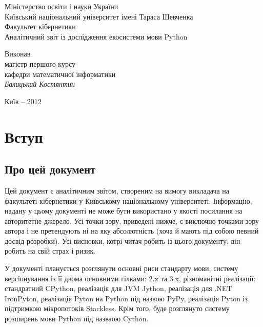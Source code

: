 \documentclass[a4paper, 12pt, onsedie]{article}
\begin{document}
\begin{titlepage}
    \begin{center}
        \normalsize{
            Міністерство освіти і науки України\\
            Київський національний університет імені Тараса Шевченка\\
            Факультет кібернетики\\[4.0cm]
        }
        \Huge{Аналітичний звіт із дослідження екосистеми мови Python}\\[9.0cm]
        \large{
            \begin{flushright}
                \parbox[position=right]{230px}{
                    Виконав\\
                    магістр першого курсу\\
                    кафедри математичної інформатики\\
                    \textit{Балицький Костянтин}
                }
            \end{flushright}
        }

        \vfill{\normalsize{Київ -- 2012}}
    \end{center}
\end{titlepage}

\tableofcontents
\pagebreak

\section{Вступ}

\subsection{Про цей документ}

    Цей документ є аналітичним звітом, створеним на вимогу викладача на факультеті кібернетики у Київському
    національному університеті. Інформацію, надану у цьому документі не може бути використано у якості посилання на
    авторитетне джерело. Усі точки зору, приведені нижче, є виключно точками зору автора і не претендують ні на яку
    абсолютність (хоча й мають під собою певний досвід розробки). Усі висновки, котрі читач робить із цього
    документу, він робить на свій страх і ризик.

    У документі планується розглянути основні риси стандарту мови, систему версіонування із її двома основними
    гілками: 2.x та 3.x, різноманітні реалізації: стандратний CPython, реалізація для JVM Jython, реалізація для 
    .NET IronPyton, реалізація Pyton на Python під назвою PyPy, реалізація Pyton із підтримкою мікропотоків Stackless. 
    Крім того, буде розглянуто систему розширень мови Python під назваою Cython.
\end{document}
